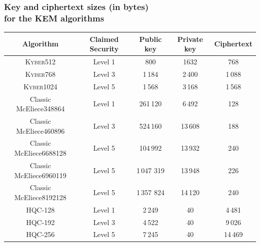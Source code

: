 \begin{frame}
    \frametitle{Key and ciphertext sizes (in bytes)\\for the KEM algorithms}
    \begin{table}[h]
    \centering
    \begin{tabular}[p]{| c | c | c | c | c |}
        \hline
        \textbf{Algorithm} & \textbf{Claimed Security} & \textbf{Public key} & \textbf{Private key} & \textbf{Ciphertext} \\ \hline
        \textsc{Kyber512} & Level 1 & 800 & 1632 & 768 \\
        \textsc{Kyber768} & Level 3 & 1\,184 & 2\,400 & 1\,088 \\
        \textsc{Kyber1024} & Level 5 & 1\,568 & 3\,168 & 1\,568 \\
        \hline
        Classic McEliece348864 & Level 1 &  261\,120 & 6\,492 & 128 \\
        Classic McEliece460896 & Level 3 & 524\,160 & 13\,608 & 188 \\
        Classic McEliece6688128 & Level 5 & 104\,992 & 13\,932 & 240 \\
        Classic McEliece6960119 & Level 5 & 1\,047 319 & 13\,948 & 226 \\
        Classic McEliece8192128 & Level 5 & 1\,357 824 & 14\,120 & 240 \\
        \hline
        HQC-128 & Level 1 & 2\,249 & 40 & 4\,481 \\
        HQC-192 & Level 3 & 4\,522 & 40 & 9\,026 \\
        HQC-256 & Level 5 & 7\,245 & 40 & 14\,469 \\
        \hline
    \end{tabular}
    \end{table}
\end{frame}


